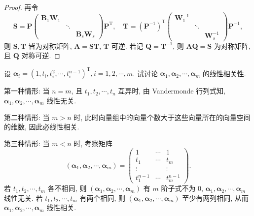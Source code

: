 \documentclass[../../main.tex]{subfiles}
\begin{document}
\begin{proof}
再令
$$
\boldsymbol{S} = \boldsymbol{P}\begin{pmatrix}
\boldsymbol{B}_1\boldsymbol{W}_1 & & \\
& \ddots & \\
& & \boldsymbol{B}_s\boldsymbol{W}_s
\end{pmatrix}\boldsymbol{P}^{\mathrm{T}},
\quad
\boldsymbol{T} = (\boldsymbol{P}^{-1})^{\mathrm{T}}\begin{pmatrix}
\boldsymbol{W}_1^{-1} & & \\
& \ddots & \\
& & \boldsymbol{W}_s^{-1}
\end{pmatrix}\boldsymbol{P}^{-1},
$$
则 $\boldsymbol{S}, \boldsymbol{T}$ 皆为对称矩阵, $\boldsymbol{A} = \boldsymbol{S}\boldsymbol{T}$, $\boldsymbol{T}$ 可逆. 若记 $\boldsymbol{Q} = \boldsymbol{T}^{-1}$, 则 $\boldsymbol{A}\boldsymbol{Q} = \boldsymbol{S}$ 为对称矩阵, 且 $\boldsymbol{Q}$ 对称可逆.
\end{proof}

\begin{example}
设 $\boldsymbol{\alpha}_i = (1, t_i, t_i^2, \cdots, t_i^{n-1})^{\mathrm{T}}, i = 1, 2, \cdots, m$. 试讨论 $\boldsymbol{\alpha}_1, \boldsymbol{\alpha}_2, \cdots, \boldsymbol{\alpha}_m$ 的线性相关性.
\end{example}
\begin{solution}
第一种情形: 当 $n = m$, 且 $t_1, t_2, \cdots, t_n$ 互异时, 由 Vandermonde 行列式知, $\boldsymbol{\alpha}_1, \boldsymbol{\alpha}_2, \cdots, \boldsymbol{\alpha}_m$ 线性无关.

第二种情形: 当 $m > n$ 时, 此时向量组中的向量个数大于这些向量所在的向量空间的维数, 因此必线性相关.

第三种情形: 当 $m < n$ 时, 考察矩阵
$$
\left( \boldsymbol{\alpha}_1, \boldsymbol{\alpha}_2, \cdots, \boldsymbol{\alpha}_m \right) = \begin{pmatrix}
1 & \cdots & 1 \\
t_1 & \cdots & t_m \\
\vdots & & \vdots \\
t_1^{n-1} & \cdots & t_m^{n-1}
\end{pmatrix}.
$$
若 $t_1, t_2, \cdots, t_m$ 各不相同, 则 $\left( \boldsymbol{\alpha}_1, \boldsymbol{\alpha}_2, \cdots, \boldsymbol{\alpha}_m \right)$ 有 $m$ 阶子式不为 $0$, $\boldsymbol{\alpha}_1, \boldsymbol{\alpha}_2, \cdots, \boldsymbol{\alpha}_m$ 线性无关. 若 $t_1, t_2, \cdots, t_m$ 有两个相同, 则 $\left( \boldsymbol{\alpha}_1, \boldsymbol{\alpha}_2, \cdots, \boldsymbol{\alpha}_m \right)$ 至少有两列相同, 从而 $\boldsymbol{\alpha}_1, \boldsymbol{\alpha}_2, \cdots, \boldsymbol{\alpha}_m$ 线性相关.
\end{solution}
\end{document}
